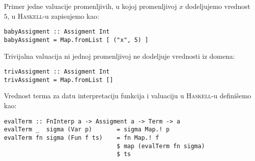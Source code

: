 \documentclass[a4paper,10pt]{article}
\theoremstyle{definition}
\begin{document}
Primer jedne valuacije promenljivih, u kojoj promenljivoj $x$ dodeljujemo vrednost $5$, u \textsc{Haskell}-u zapisujemo kao:
\begin{lstlisting}
babyAssigment :: Assigment Int
babyAssigment = Map.fromList [ ("x", 5) ]
\end{lstlisting}
Trivijalna valuacija ni jednoj promenljivoj ne dodeljuje vrednosti iz domena:
\begin{lstlisting}
trivAssigment :: Assigment Int
trivAssigment = Map.fromList []
\end{lstlisting}

Vrednost terma za datu interpretaciju funkcija i valuaciju u \textsc{Haskell}-u definišemo kao:
\begin{lstlisting}
evalTerm :: FnInterp a -> Assigment a -> Term -> a
evalTerm _  sigma (Var p)       = sigma Map.! p
evalTerm fn sigma (Fun f ts)    = fn Map.! f
                                $ map (evalTerm fn sigma)
                                $ ts
\end{lstlisting}
\end{document}
